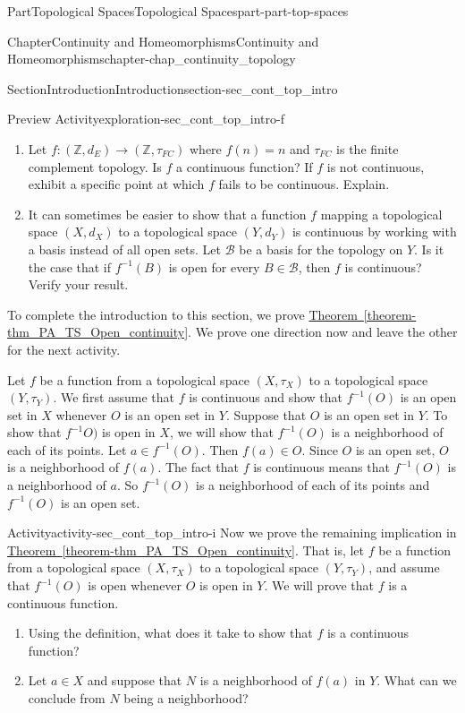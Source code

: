 \documentclass[oneside,10pt,]{book}
\newcommand{\xreffont}{\relax}
\numberwithin{equation}{chapter}
\newcommand{\Z}{\mathbb{Z}}
\newcommand{\B}{\mathcal{B}}
\begin{document}
\begin{partptx}{Part}{Topological Spaces}{}{Topological Spaces}{}{}{part-part-top-spaces}
\begin{chapterptx}{Chapter}{Continuity and Homeomorphisms}{}{Continuity and Homeomorphisms}{}{}{chapter-chap_continuity_topology}
\begin{sectionptx}{Section}{Introduction}{}{Introduction}{}{}{section-sec_cont_top_intro}
\begin{exploration}{Preview Activity}{}{exploration-sec_cont_top_intro-f}
\begin{enumerate}[font=\bfseries,label=(\alph*),ref=\alph*]
\item{}Let \(f:(\Z, d_E) \to (\Z,\tau_{FC})\) where \(f(n) = n\) and \(\tau_{FC}\) is the finite complement topology. Is \(f\) a continuous function? If \(f\) is not continuous, exhibit a specific point at which \(f\) fails to be continuous. Explain.%
\item{}It can sometimes be easier to show that a function \(f\) mapping a topological space \((X,d_X)\) to a topological space \((Y,d_Y)\) is continuous by working with a basis instead of all open sets. Let \(\B\) be a basis for the topology on \(Y\). Is it the case that if \(f^{-1}(B)\) is open for every \(B \in \B\), then \(f\) is continuous? Verify your result.%
\end{enumerate}%
\end{exploration}%
To complete the introduction to this section, we prove \hyperref[theorem-thm_PA_TS_Open_continuity]{Theorem~{\xreffont\ref{theorem-thm_PA_TS_Open_continuity}}}. We prove one direction now and leave the other for the next activity.%
\par
Let \(f\) be a function from a topological space \((X, \tau_X)\) to a topological space \((Y, \tau_Y)\). We first assume that \(f\) is continuous and show that \(f^{-1}(O)\) is an open set in \(X\) whenever \(O\) is an open set in \(Y\). Suppose that \(O\) is an open set in \(Y\). To show that \(f^{-1}O)\) is open in \(X\), we will show that \(f^{-1}(O)\) is a neighborhood of each of its points. Let \(a \in f^{-1}(O)\). Then \(f(a) \in O\). Since \(O\) is an open set, \(O\) is a neighborhood of \(f(a)\). The fact that \(f\) is continuous means that \(f^{-1}(O)\) is a neighborhood of \(a\). So \(f^{-1}(O)\) is a neighborhood of each of its points and \(f^{-1}(O)\) is an open set.%
\begin{activity}{Activity}{}{activity-sec_cont_top_intro-i}%
Now we prove the remaining implication in \hyperref[theorem-thm_PA_TS_Open_continuity]{Theorem~{\xreffont\ref{theorem-thm_PA_TS_Open_continuity}}}. That is, let \(f\) be a function from a topological space \((X, \tau_X)\) to a topological space \((Y, \tau_Y)\), and assume that \(f^{-1}(O)\) is open whenever \(O\) is open in \(Y\). We will prove that \(f\) is a continuous function.%
\begin{enumerate}[font=\bfseries,label=(\alph*),ref=\alph*]%
\item{}Using the definition, what does it take to show that \(f\) is a continuous function?%
\item{}Let \(a \in X\) and suppose that \(N\) is a neighborhood of \(f(a)\) in \(Y\). What can we conclude from \(N\) being a neighborhood?%

\end{enumerate}
\end{activity}
\end{sectionptx}
\end{chapterptx}
\end{partptx}
\end{document}
